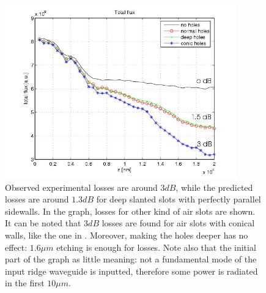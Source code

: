 \begin{figure}[htbp]
  \begin{center}
    \includegraphics[width=10cm]{pics/polrot_different_holes}
  \end{center}
  \caption{Observed experimental losses are around $3 dB$, while the
    \threeDFDTD predicted losses are around $1.3 dB$ for deep slanted
    slots with perfectly parallel sidewalls. In the graph, losses for
    other kind of air slots are shown. It can be noted that $3 dB$
    losses are found for air slots with conical walls, like the one in
    . Moreover, making the
    holes deeper has no effect: $1.6 \mu m$ etching is enough for
    losses. Note also that the initial part of the graph as little
    meaning: not a fundamental mode of the input ridge waveguide is
    inputted, therefore some power is radiated in the first $10 \mu
    m$.}
  \label{fig:polrot_holes}
\end{figure}

